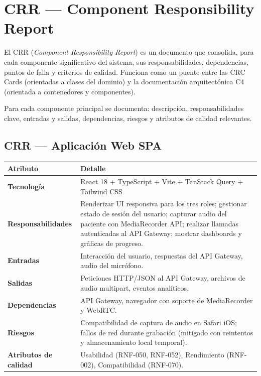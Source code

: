 
\chapter{CRR --- Component Responsibility Report}

El CRR (\textit{Component Responsibility Report}) es un documento que consolida, para cada componente significativo del sistema, sus responsabilidades, dependencias, puntos de falla y criterios de calidad. Funciona como un puente entre las CRC Cards (orientadas a clases del dominio) y la documentación arquitectónica C4 (orientada a contenedores y componentes).

Para cada componente principal se documenta: descripción, responsabilidades clave, entradas y salidas, dependencias, riesgos y atributos de calidad relevantes.

\newcommand{\crrrow}[2]{%
  \textbf{\color{fmAccent}#1} & #2 \\
}

\section{CRR --- Aplicación Web SPA}

\begin{tabularx}{\textwidth}{>{\bfseries}L{3.5cm} X}
  \toprule
  \textbf{\color{fmAccent}Atributo} & \textbf{\color{fmAccent}Detalle} \\
  \midrule
  Tecnología & React 18 + TypeScript + Vite + TanStack Query + Tailwind CSS \\
  Responsabilidades & Renderizar UI responsiva para los tres roles; gestionar estado de sesión del usuario; capturar audio del paciente con MediaRecorder API; realizar llamadas autenticadas al API Gateway; mostrar dashboards y gráficas de progreso. \\
  Entradas & Interacción del usuario, respuestas del API Gateway, audio del micrófono. \\
  Salidas & Peticiones HTTP/JSON al API Gateway, archivos de audio multipart, eventos analíticos. \\
  Dependencias & API Gateway, navegador con soporte de MediaRecorder y WebRTC. \\
  Riesgos & Compatibilidad de captura de audio en Safari iOS; fallos de red durante grabación (mitigado con reintentos y almacenamiento local temporal). \\
  Atributos de calidad & Usabilidad (RNF-050, RNF-052), Rendimiento (RNF-002), Compatibilidad (RNF-070). \\
  \bottomrule
\end{tabularx}

